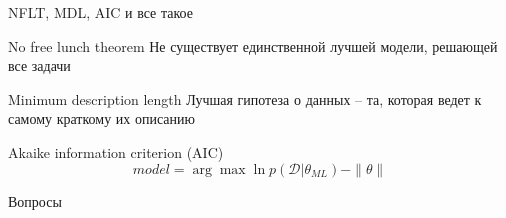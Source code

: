 \documentclass[10pt]{beamer}
\begin{document}
\begin{frame}{NFLT, MDL, AIC и все такое}

\begin{block}{No free lunch theorem}
Не существует единственной лучшей модели, решающей все задачи
\end{block}

\begin{block}{Minimum description length}
Лучшая гипотеза о данных -- та, которая ведет к самому краткому их описанию
\end{block}
\begin{block}{Akaike information criterion (AIC)}
\[
model = \arg\max	\ln p(\mathcal{D} | \theta_{ML}) - \|\theta\|
\]
\end{block}

\end{frame}

\begin{frame}[plain]
\begin{center}
{\Large Вопросы}
\end{center}
\end{frame}
\end{document}
